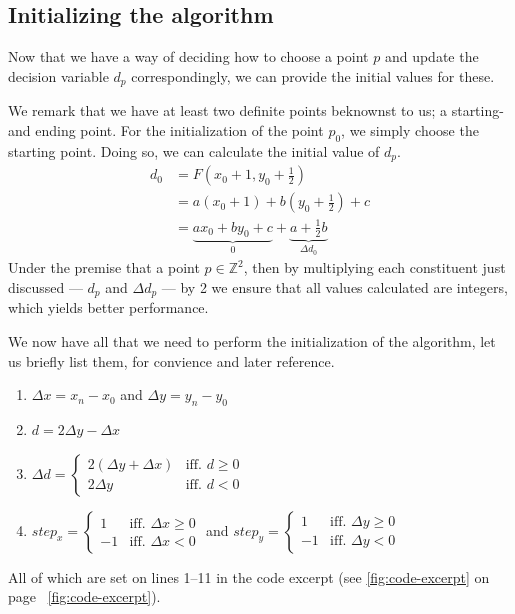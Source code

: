 \documentclass[11pt]{article}
\begin{document}
\subsection{Initializing the algorithm}
Now that we have a way of deciding how to choose a point $p$ and update the
decision variable $d_p$ correspondingly, we can provide the initial values for
these.

We remark that we have at least two definite points beknownst to us; a
starting- and ending point. For the initialization of the point $p_0$, we
simply choose the starting point. Doing so, we can calculate the initial value
of $d_p$.
\begin{align}
    d_0
    &= F(x_0 + 1, y_0 + \frac{1}{2}) \\
    &= a(x_0 + 1) + b(y_0 + \frac{1}{2}) + c \\
    &= \underbrace{ax_0 + by_0 + c}_{0}
     + \underbrace{a + \frac{1}{2}b}_{\Delta d_0}
\end{align}
Under the premise that a point $p \in \mathbb{Z}^2$, then by multiplying each
constituent just discussed --- $d_p$ and $\Delta d_p$ --- by 2 we ensure that
all values calculated are integers, which yields better performance.

We now have all that we need to perform the initialization of the algorithm,
let us briefly list them, for convience and later reference.
\begin{enumerate}
    \item $\Delta x = x_n - x_0$ and $\Delta y = y_n - y_0$
    \item $d = 2 \Delta y - \Delta x$
    \item $\Delta d =
        \begin{cases}
            2(\Delta y + \Delta x) &\mbox{iff. $d \geq 0$} \\
            2 \Delta y &\mbox{iff. $d < 0$}
        \end{cases}$ \\
    \item $step_x =
        \begin{cases}
             1 &\mbox{iff. $\Delta x \geq 0$} \\
            -1 &\mbox{iff. $\Delta x < 0$}
        \end{cases}$ and $step_y =
        \begin{cases}
             1 &\mbox{iff. $\Delta y \geq 0$} \\
            -1 &\mbox{iff. $\Delta y < 0$}
        \end{cases}$ \\
\end{enumerate}
All of which are set on lines 1--11 in the code excerpt (see
\ref{fig:code-excerpt} on page ~\ref{fig:code-excerpt}).
\end{document}
